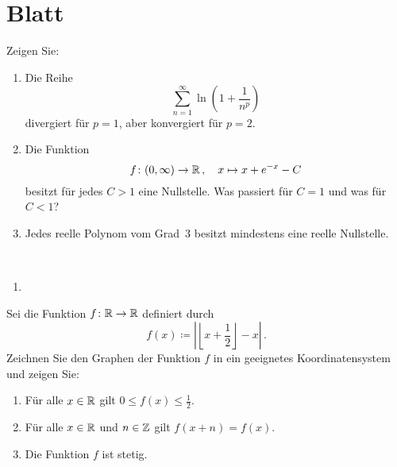 \section{Blatt}

\begin{aufg}[6 Punkte]
Zeigen Sie:
\begin{enumerate}[label=$\mathrm{(\roman*)}$, ref=$\mathrm{\roman*}$]
\item Die Reihe
\[
 \sum_{n=1}^\infty \ln\left( 1 + \frac{1}{n^p} \right)
\]
divergiert f\"ur $p=1$, aber konvergiert f\"ur $p=2$.
\item Die Funktion 
\[
 f\colon (0,\infty)\to\mathbb{R}\,,\quad x\mapsto x + e^{-x} - C
\]
besitzt f\"ur jedes $C>1$ eine Nullstelle. Was passiert f\"ur $C=1$ und was f\"ur $C<1$?
\item Jedes reelle Polynom vom Grad~$3$ besitzt mindestens eine reelle Nullstelle.
\end{enumerate}
\end{aufg}


\bigskip

\begin{lsg}\mbox{ }
\begin{enumerate}[label=$\mathrm{(\roman*)}$, ref=$\mathrm{\roman*}$]
\item 
\end{enumerate}
\end{lsg}


\bigskip


\begin{aufg}[6 Punkte]
Sei die Funktion $f\colon\mathbb{R}\rightarrow\mathbb{R}$ definiert durch 
\[
f(x)\coloneqq \left| \left\lfloor x+\frac{1}{2} \right\rfloor -x \right|\,.
\]
Zeichnen Sie den Graphen der Funktion $f$ in ein geeignetes Koordinatensystem und zeigen Sie:
\begin{enumerate}[label=$\mathrm{(\roman*)}$, ref=$\mathrm{\roman*}$]
    \item F\"ur alle $x\in\mathbb{R}$ gilt $0\le f(x) \le \frac{1}{2}$.
    \item F\"ur alle $x\in \mathbb{R}$ und $n\in\mathbb{Z}$ gilt $f(x+n)=f(x)$.
    \item Die Funktion $f$ ist stetig.
\end{enumerate}
\end{aufg}

\bigskip

\begin{lsg}
\end{lsg}


\bigskip


